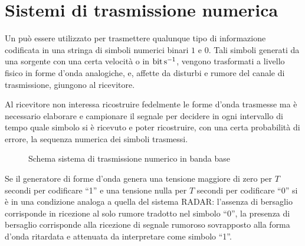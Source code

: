 \chapter{Sistemi di trasmissione numerica}
Un  può essere utilizzato per trasmettere qualunque tipo di informazione codificata in una stringa di simboli numerici binari $1$ e $0$. Tali simboli generati da una sorgente con una certa velocità o  in $\si{\bit\per\second}$, vengono trasformati a livello fisico in forme d'onda analogiche, e, affette da disturbi e rumore del canale di trasmissione, giungono al ricevitore. 

Al ricevitore non interessa ricostruire fedelmente le forme d'onda trasmesse ma è necessario elaborare e campionare il segnale per decidere in ogni intervallo di tempo quale simbolo si è ricevuto e poter ricostruire, con una certa probabilità di errore, la sequenza numerica dei simboli trasmessi.

\begin{figure}[!ht]
	\centering
	\caption{Schema sistema di trasmissione numerico in banda base}
	\label{fig:schema_sistema_trasmissione_numerico_banda_base}
\end{figure}

Se il generatore di forme d'onda genera una tensione maggiore di zero per $T$ secondi per codificare “1” e una tensione nulla per $T$ secondi per codificare “0” si è in una condizione analoga a quella del sistema \ac{RADAR}: l'assenza di bersaglio corrisponde in ricezione al solo rumore tradotto nel simbolo “0”, la presenza di bersaglio corrisponde alla ricezione di segnale rumoroso sovrapposto alla forma d'onda ritardata e attenuata da interpretare come simbolo “1”.

